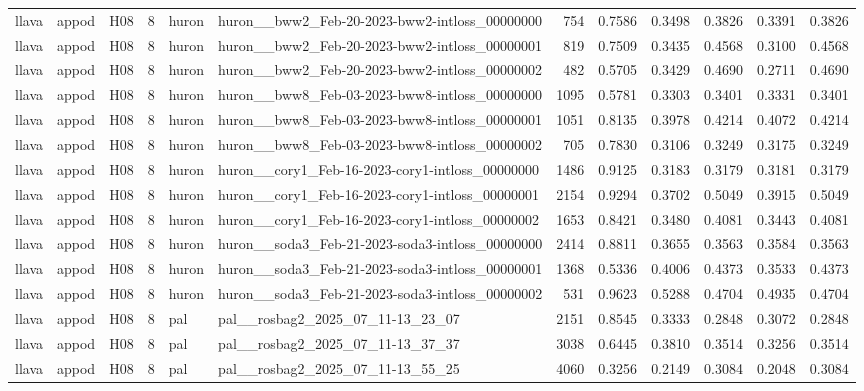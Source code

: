 \begin{table}[tbp]
\begin{tabular}{lllrllrrrrrr}
llava & appod & H08 & 8 & huron & huron\_\_bww2\_Feb-20-2023-bww2-intloss\_00000000 & 754 & 0.7586 & 0.3498 & 0.3826 & 0.3391 & 0.3826 \\
llava & appod & H08 & 8 & huron & huron\_\_bww2\_Feb-20-2023-bww2-intloss\_00000001 & 819 & 0.7509 & 0.3435 & 0.4568 & 0.3100 & 0.4568 \\
llava & appod & H08 & 8 & huron & huron\_\_bww2\_Feb-20-2023-bww2-intloss\_00000002 & 482 & 0.5705 & 0.3429 & 0.4690 & 0.2711 & 0.4690 \\
llava & appod & H08 & 8 & huron & huron\_\_bww8\_Feb-03-2023-bww8-intloss\_00000000 & 1095 & 0.5781 & 0.3303 & 0.3401 & 0.3331 & 0.3401 \\
llava & appod & H08 & 8 & huron & huron\_\_bww8\_Feb-03-2023-bww8-intloss\_00000001 & 1051 & 0.8135 & 0.3978 & 0.4214 & 0.4072 & 0.4214 \\
llava & appod & H08 & 8 & huron & huron\_\_bww8\_Feb-03-2023-bww8-intloss\_00000002 & 705 & 0.7830 & 0.3106 & 0.3249 & 0.3175 & 0.3249 \\
llava & appod & H08 & 8 & huron & huron\_\_cory1\_Feb-16-2023-cory1-intloss\_00000000 & 1486 & 0.9125 & 0.3183 & 0.3179 & 0.3181 & 0.3179 \\
llava & appod & H08 & 8 & huron & huron\_\_cory1\_Feb-16-2023-cory1-intloss\_00000001 & 2154 & 0.9294 & 0.3702 & 0.5049 & 0.3915 & 0.5049 \\
llava & appod & H08 & 8 & huron & huron\_\_cory1\_Feb-16-2023-cory1-intloss\_00000002 & 1653 & 0.8421 & 0.3480 & 0.4081 & 0.3443 & 0.4081 \\
llava & appod & H08 & 8 & huron & huron\_\_soda3\_Feb-21-2023-soda3-intloss\_00000000 & 2414 & 0.8811 & 0.3655 & 0.3563 & 0.3584 & 0.3563 \\
llava & appod & H08 & 8 & huron & huron\_\_soda3\_Feb-21-2023-soda3-intloss\_00000001 & 1368 & 0.5336 & 0.4006 & 0.4373 & 0.3533 & 0.4373 \\
llava & appod & H08 & 8 & huron & huron\_\_soda3\_Feb-21-2023-soda3-intloss\_00000002 & 531 & 0.9623 & 0.5288 & 0.4704 & 0.4935 & 0.4704 \\
llava & appod & H08 & 8 & pal & pal\_\_rosbag2\_2025\_07\_11-13\_23\_07 & 2151 & 0.8545 & 0.3333 & 0.2848 & 0.3072 & 0.2848 \\
llava & appod & H08 & 8 & pal & pal\_\_rosbag2\_2025\_07\_11-13\_37\_37 & 3038 & 0.6445 & 0.3810 & 0.3514 & 0.3256 & 0.3514 \\
llava & appod & H08 & 8 & pal & pal\_\_rosbag2\_2025\_07\_11-13\_55\_25 & 4060 & 0.3256 & 0.2149 & 0.3084 & 0.2048 & 0.3084 \\

\end{tabular}
\end{table}
